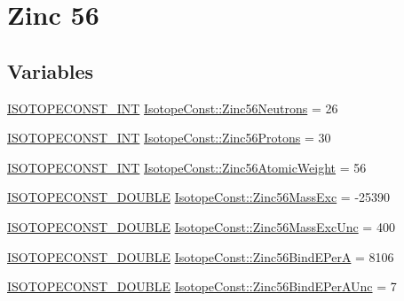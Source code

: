 \hypertarget{group___isotope_const-_zinc-_zn56}{}\section{Zinc 56}
\label{group___isotope_const-_zinc-_zn56}
\subsection*{Variables}
\begin{DoxyCompactItemize}
\item 
\mbox{\hyperlink{group___isotope_const-_macros_ga5f18360b3e99483a35c32d789e62621c}{I\+S\+O\+T\+O\+P\+E\+C\+O\+N\+S\+T\+\_\+\+I\+NT}} \mbox{\hyperlink{group___isotope_const-_zinc-_zn56_ga4fa489739e592c26a79c1e68566d116a}{Isotope\+Const\+::\+Zinc56\+Neutrons}} = 26
\item 
\mbox{\hyperlink{group___isotope_const-_macros_ga5f18360b3e99483a35c32d789e62621c}{I\+S\+O\+T\+O\+P\+E\+C\+O\+N\+S\+T\+\_\+\+I\+NT}} \mbox{\hyperlink{group___isotope_const-_zinc-_zn56_ga5550698ec38852f999f9315f40fce747}{Isotope\+Const\+::\+Zinc56\+Protons}} = 30
\item 
\mbox{\hyperlink{group___isotope_const-_macros_ga5f18360b3e99483a35c32d789e62621c}{I\+S\+O\+T\+O\+P\+E\+C\+O\+N\+S\+T\+\_\+\+I\+NT}} \mbox{\hyperlink{group___isotope_const-_zinc-_zn56_ga5f1e529f2f323c68df9775b316fa665d}{Isotope\+Const\+::\+Zinc56\+Atomic\+Weight}} = 56
\item 
\mbox{\hyperlink{group___isotope_const-_macros_ga8f45a7272ce02c0b4c65c44636ed719a}{I\+S\+O\+T\+O\+P\+E\+C\+O\+N\+S\+T\+\_\+\+D\+O\+U\+B\+LE}} \mbox{\hyperlink{group___isotope_const-_zinc-_zn56_gac26998542889d68b567612a8b8f03867}{Isotope\+Const\+::\+Zinc56\+Mass\+Exc}} = -\/25390
\item 
\mbox{\hyperlink{group___isotope_const-_macros_ga8f45a7272ce02c0b4c65c44636ed719a}{I\+S\+O\+T\+O\+P\+E\+C\+O\+N\+S\+T\+\_\+\+D\+O\+U\+B\+LE}} \mbox{\hyperlink{group___isotope_const-_zinc-_zn56_gacbbb944f19a329639e73bb31bad26c17}{Isotope\+Const\+::\+Zinc56\+Mass\+Exc\+Unc}} = 400
\item 
\mbox{\hyperlink{group___isotope_const-_macros_ga8f45a7272ce02c0b4c65c44636ed719a}{I\+S\+O\+T\+O\+P\+E\+C\+O\+N\+S\+T\+\_\+\+D\+O\+U\+B\+LE}} \mbox{\hyperlink{group___isotope_const-_zinc-_zn56_gab3461f9e71cb4dc98e1e120f53c3626f}{Isotope\+Const\+::\+Zinc56\+Bind\+E\+PerA}} = 8106
\item 
\mbox{\hyperlink{group___isotope_const-_macros_ga8f45a7272ce02c0b4c65c44636ed719a}{I\+S\+O\+T\+O\+P\+E\+C\+O\+N\+S\+T\+\_\+\+D\+O\+U\+B\+LE}} \mbox{\hyperlink{group___isotope_const-_zinc-_zn56_gabd9cfdfc93c6ac318b380eed662d5f74}{Isotope\+Const\+::\+Zinc56\+Bind\+E\+Per\+A\+Unc}} = 7

\end{DoxyCompactItemize}
